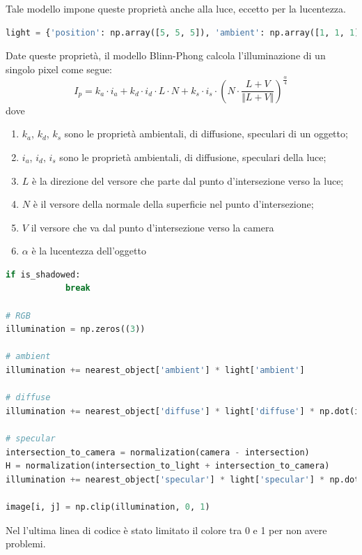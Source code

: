 \documentclass[9pt,a4paper,twoside]{tau}
\begin{document}
Tale modello impone queste proprietà anche alla luce, eccetto per la lucentezza.
\begin{lstlisting}[language=Python]
light = {'position': np.array([5, 5, 5]), 'ambient': np.array([1, 1, 1]), 'diffuse': np.array([1, 1, 1]), 'specular':np.array[1, 1, 1]}
\end{lstlisting}
Date queste proprietà, il modello Blinn-Phong calcola l'illuminazione di un singolo pixel come segue:
\begin{equation*}
	I_p = k_a \cdot i_a + k_d \cdot i_d \cdot L \cdot N + k_s \cdot i_s \cdot \left( N \cdot \frac{L+V}{\Vert L + V \Vert} \right)^{\frac{\alpha}{4}}
\end{equation*}
dove
\begin{enumerate}
	\item $k_a$, $k_d$, $k_s$ sono le proprietà ambientali, di diffusione, speculari di un oggetto;
	\item $i_a$, $i_d$, $i_s$ sono le proprietà ambientali, di diffusione, speculari della luce;
	\item $L$ è la direzione del versore che parte dal punto d'intersezione verso la luce;
	\item $N$ è il versore della normale della superficie nel punto d'intersezione;
	\item $V$ il versore che va dal punto d'intersezione verso la camera
	\item $\alpha$ è la lucentezza dell'oggetto
\end{enumerate}

\begin{lstlisting}[language=Python]
if is_shadowed:
            break

# RGB
illumination = np.zeros((3))

# ambient
illumination += nearest_object['ambient'] * light['ambient']

# diffuse
illumination += nearest_object['diffuse'] * light['diffuse'] * np.dot(intersection_to_light, normal_to_surface)

# specular
intersection_to_camera = normalization(camera - intersection)
H = normalization(intersection_to_light + intersection_to_camera)
illumination += nearest_object['specular'] * light['specular'] * np.dot(normal_to_surface, H) ** (nearest_object['shininess']/4)

image[i, j] = np.clip(illumination, 0, 1) 
\end{lstlisting}
Nel l'ultima linea di codice è stato limitato il colore tra 0 e 1 per non avere problemi.\\
\end{document}
